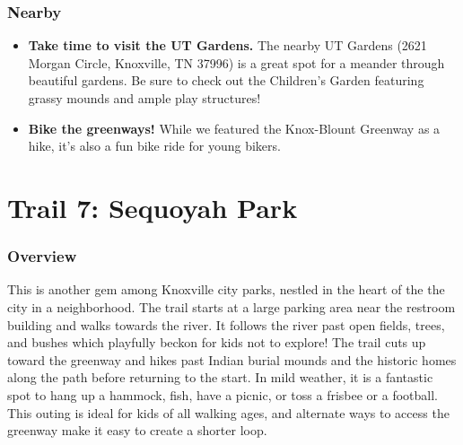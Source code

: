 \documentclass[
  letterpaper,
  DIV=11,
  numbers=noendperiod]{scrreprt}
\providecommand{\tightlist}{%
  \setlength{\itemsep}{0pt}\setlength{\parskip}{0pt}}\usepackage{longtable,booktabs,array}
\begin{document}
\subsection{Nearby}\label{nearby-5}

\begin{itemize}
\tightlist
\item
  \textbf{Take time to visit the UT Gardens.} The nearby UT Gardens
  (2621 Morgan Circle, Knoxville, TN 37996) is a great spot for a
  meander through beautiful gardens. Be sure to check out the Children's
  Garden featuring grassy mounds and ample play structures!
\item
  \textbf{Bike the greenways!} While we featured the Knox-Blount
  Greenway as a hike, it's also a fun bike ride for young bikers.
\end{itemize}

\chapter{Trail 7: Sequoyah Park}\label{trail-7-sequoyah-park}

\subsection{Overview}\label{overview-7}

This is another gem among Knoxville city parks, nestled in the heart of
the the city in a neighborhood. The trail starts at a large parking area
near the restroom building and walks towards the river. It follows the
river past open fields, trees, and bushes which playfully beckon for
kids not to explore! The trail cuts up toward the greenway and hikes
past Indian burial mounds and the historic homes along the path before
returning to the start. In mild weather, it is a fantastic spot to hang
up a hammock, fish, have a picnic, or toss a frisbee or a football. This
outing is ideal for kids of all walking ages, and alternate ways to
access the greenway make it easy to create a shorter loop.
\end{document}
